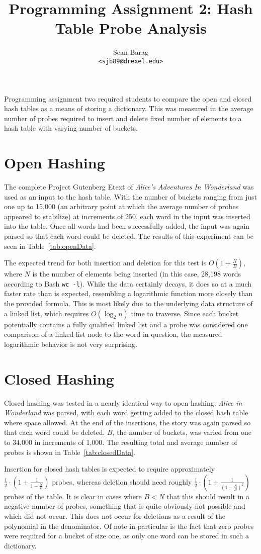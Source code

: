 \documentclass{article}
\title{Programming Assignment 2: Hash Table Probe Analysis}
\author{Sean Barag\\ \texttt{<sjb89@drexel.edu>}}
\begin{document}
\maketitle
Programming assignment two required students to compare the open and closed
hash tables as a means of storing a dictionary.  This was measured in the
average number of probes required to insert and delete fixed number of elements
to a hash table with varying number of buckets.

\section{Open Hashing}
The complete Project Gutenberg Etext of \emph{Alice's Adventures In Wonderland}
was used as an input to the hash table.  With the number of buckets ranging
from just one up to 15,000 (an arbitrary point at which the average number of
probes appeared to stabilize) at increments of 250, each word in the input was
inserted into the table.  Once all words had been successfully added, the input
was again parsed so that each word could be deleted.  The results of this
experiment can be seen in Table~\ref{tab:openData}.
%

%
The expected trend for both insertion and deletion for this test is $O(1 +
\frac{N}{B})$, where $N$ is the number of elements being inserted (in this
case, 28,198 words according to Bash \texttt{wc -l}).  While the data certainly
decays, it does so at a much faster rate than is expected, resembling a
logarithmic function more closely than the provided formula.  This is most
likely due to the underlying data structure of a linked list, which requires
$O(\log_2 n)$ time to traverse.  Since each bucket potentially contains a fully
qualified linked list and a probe was considered one comparison of a linked
list node to the word in question, the measured logarithmic behavior is not
very surprising.

\section{Closed Hashing}
Closed hashing was tested in a nearly identical way to open hashing:
\emph{Alice in Wonderland} was parsed, with each word getting added to the
closed hash table where space allowed.  At the end of the insertions, the story
was again parsed so that each word could be deleted.  $B$, the number of
buckets, was varied from one to 34,000 in increments of 1,000. The resulting
total and average number of probes is shown in Table~\ref{tab:closedData}.
%

%
Insertion for closed hash tables is expected to require approximately
$\frac{1}{2} \cdot \left(1 + \frac{1}{1-\frac{N}{B}}\right)$ probes, whereas
deletion should need roughly $\frac{1}{2} \cdot \left(1 +
\frac{1}{\left(1-\frac{N}{B}\right)^2}\right)$ probes of the table.  It is
clear in cases where $B < N$ that this should result in a negative number of
probes, something that is quite obviously not possible and which did not occur.
This does not occur for deletions as a result of the polynomial in the
denominator.  Of note in particular is the fact that zero probes were required
for a bucket of size one, as only one word can be stored in such a dictionary.
\end{document}
